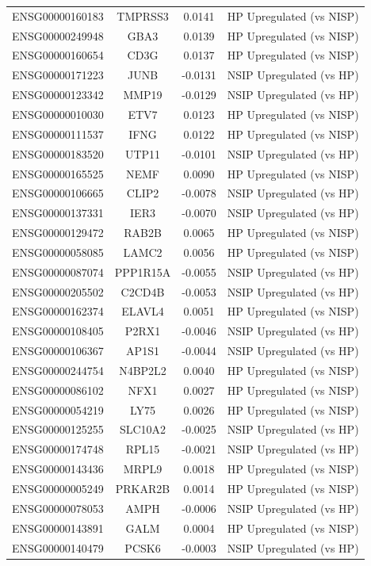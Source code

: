 \documentclass[
]{article}
\begin{document}
\begin{singlespace}
\begin{longtable}[t]{lccc}
\addlinespace
ENSG00000160183 & TMPRSS3 & 0.0141 & HP Upregulated (vs NISP)\\
ENSG00000249948 & GBA3 & 0.0139 & HP Upregulated (vs NISP)\\
ENSG00000160654 & CD3G & 0.0137 & HP Upregulated (vs NISP)\\
ENSG00000171223 & JUNB & -0.0131 & NSIP Upregulated (vs HP)\\
ENSG00000123342 & MMP19 & -0.0129 & NSIP Upregulated (vs HP)\\
\addlinespace
ENSG00000010030 & ETV7 & 0.0123 & HP Upregulated (vs NISP)\\
ENSG00000111537 & IFNG & 0.0122 & HP Upregulated (vs NISP)\\
ENSG00000183520 & UTP11 & -0.0101 & NSIP Upregulated (vs HP)\\
ENSG00000165525 & NEMF & 0.0090 & HP Upregulated (vs NISP)\\
ENSG00000106665 & CLIP2 & -0.0078 & NSIP Upregulated (vs HP)\\
\addlinespace
ENSG00000137331 & IER3 & -0.0070 & NSIP Upregulated (vs HP)\\
ENSG00000129472 & RAB2B & 0.0065 & HP Upregulated (vs NISP)\\
ENSG00000058085 & LAMC2 & 0.0056 & HP Upregulated (vs NISP)\\
ENSG00000087074 & PPP1R15A & -0.0055 & NSIP Upregulated (vs HP)\\
ENSG00000205502 & C2CD4B & -0.0053 & NSIP Upregulated (vs HP)\\
\addlinespace
ENSG00000162374 & ELAVL4 & 0.0051 & HP Upregulated (vs NISP)\\
ENSG00000108405 & P2RX1 & -0.0046 & NSIP Upregulated (vs HP)\\
ENSG00000106367 & AP1S1 & -0.0044 & NSIP Upregulated (vs HP)\\
ENSG00000244754 & N4BP2L2 & 0.0040 & HP Upregulated (vs NISP)\\
ENSG00000086102 & NFX1 & 0.0027 & HP Upregulated (vs NISP)\\
\addlinespace
ENSG00000054219 & LY75 & 0.0026 & HP Upregulated (vs NISP)\\
ENSG00000125255 & SLC10A2 & -0.0025 & NSIP Upregulated (vs HP)\\
ENSG00000174748 & RPL15 & -0.0021 & NSIP Upregulated (vs HP)\\
ENSG00000143436 & MRPL9 & 0.0018 & HP Upregulated (vs NISP)\\
ENSG00000005249 & PRKAR2B & 0.0014 & HP Upregulated (vs NISP)\\
\addlinespace
ENSG00000078053 & AMPH & -0.0006 & NSIP Upregulated (vs HP)\\
ENSG00000143891 & GALM & 0.0004 & HP Upregulated (vs NISP)\\
ENSG00000140479 & PCSK6 & -0.0003 & NSIP Upregulated (vs HP)\\*
\end{longtable}
\endgroup{}

\end{singlespace}
\end{document}
